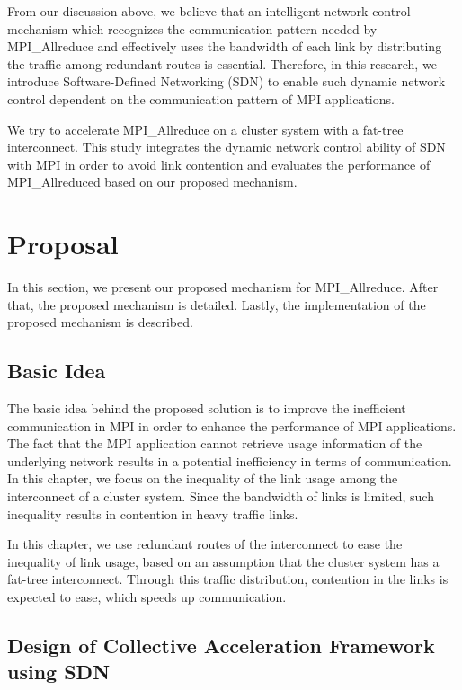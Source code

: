 From our discussion above, we believe that an intelligent network control
mechanism which recognizes the communication pattern needed by MPI\_Allreduce
and effectively uses the bandwidth of each link by distributing the traffic
among redundant routes is essential. Therefore, in this research, we introduce
Software-Defined Networking (SDN) to enable such dynamic network control
dependent on the communication pattern of MPI applications.

We try to accelerate MPI\_Allreduce on a cluster system with a fat-tree
interconnect. This study integrates the dynamic network control ability of SDN
with MPI in order to avoid link contention and evaluates the performance of
MPI\_Allreduced based on our proposed mechanism.

\section{Proposal}\label{sec:iii-proposal}

In this section, we present our proposed mechanism for MPI\_Allreduce. After
that, the proposed mechanism is detailed. Lastly, the implementation of the
proposed mechanism is described.

\subsection{Basic Idea}

The basic idea behind the proposed solution is to improve the
inefficient communication in MPI in order to enhance the performance of
MPI applications. The fact that the MPI application cannot retrieve
usage information of the underlying network results in a potential
inefficiency in terms of communication. In this chapter, we focus on the
inequality of the link usage among the interconnect of a cluster system. Since
the bandwidth of links is limited, such inequality results in contention in
heavy traffic links.

In this chapter, we use redundant routes of the interconnect to ease the
inequality of link usage, based on an assumption that the cluster system has a
fat-tree interconnect. Through this traffic distribution, contention in the
links is expected to ease, which speeds up communication.

\subsection{Design of Collective Acceleration Framework using SDN}

